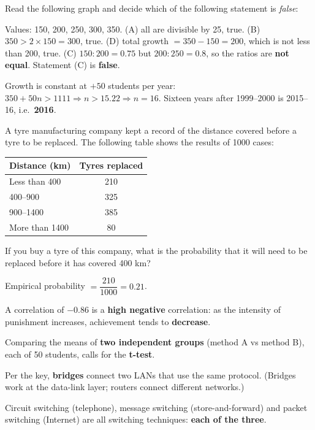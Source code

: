 Read the following graph and decide which of the following statement is \emph{false}:

Values: 150, 200, 250, 300, 350.
(A) all are divisible by 25, true. (B) $350>2\times150=300$, true. (D) total growth $=350-150=200$, which is not less than 200, true.
(C) $150:200=0.75$ but $200:250=0.8$, so the ratios are \textbf{not equal}. Statement (C) is \textbf{false}.

Growth is constant at $+50$ students per year: $350+50n>1111\Rightarrow n>15.22\Rightarrow n=16$.
Sixteen years after 1999--2000 is 2015--16, i.e.\ \textbf{2016}.

A tyre manufacturing company kept a record of the distance covered before a tyre to be replaced. The following table shows the results of 1000 cases:
\begin{center}\small
\begin{tabular}{lc}\toprule Distance (km) & Tyres replaced\\\midrule Less than 400 & 210\\ 400--900 & 325\\ 900--1400 & 385\\ More than 1400 & 80\\\bottomrule\end{tabular}
\end{center}
If you buy a tyre of this company, what is the probability that it will need to be replaced before it has covered 400 km?

Empirical probability $=\dfrac{210}{1000}=\mathbf{0.21}$.

A correlation of $-0.86$ is a \textbf{high negative} correlation: as the intensity of punishment increases, achievement tends to \textbf{decrease}.

Comparing the means of \textbf{two independent groups} (method A vs method B), each of 50 students, calls for the \textbf{t-test}.

Per the key, \textbf{bridges} connect two LANs that use the same protocol. (Bridges work at the data-link layer; routers connect different networks.)

Circuit switching (telephone), message switching (store-and-forward) and packet switching (Internet) are all switching techniques: \textbf{each of the three}.

